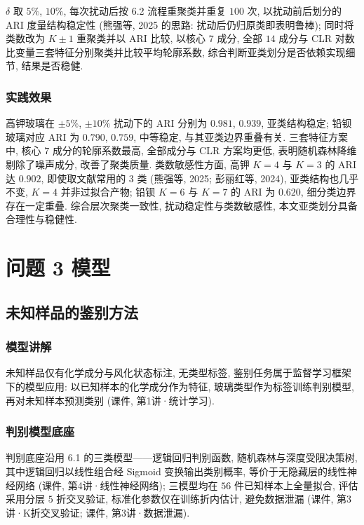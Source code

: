 \documentclass{ctexart}
\begin{document}
$\delta$ 取 $5\%$, $10\%$, 每次扰动后按 6.2 流程重聚类并重复 $100$ 次, 以扰动前后划分的 ARI 度量结构稳定性 (熊强等, 2025 的思路: 扰动后仍归原类即表明鲁棒); 同时将类数改为 $K\pm1$ 重聚类并以 ARI 比较, 以核心 $7$ 成分, 全部 $14$ 成分与 CLR 对数比变量三套特征分别聚类并比较平均轮廓系数, 综合判断亚类划分是否依赖实现细节, 结果是否稳健.


\subsubsection{实践效果}

高钾玻璃在 $\pm5\%$, $\pm10\%$ 扰动下的 ARI 分别为 $0.981$, $0.939$, 亚类结构稳定; 铅钡玻璃对应 ARI 为 $0.790$, $0.759$, 中等稳定, 与其亚类边界重叠有关. 三套特征方案中, 核心 $7$ 成分的轮廓系数最高, 全部成分与 CLR 方案均更低, 表明随机森林降维剔除了噪声成分, 改善了聚类质量. 类数敏感性方面, 高钾 $K=4$ 与 $K=3$ 的 ARI 达 $0.902$, 即使取文献常用的 $3$ 类 (熊强等, 2025; 彭丽红等, 2024), 亚类结构也几乎不变, $K=4$ 并非过拟合产物; 铅钡 $K=6$ 与 $K=7$ 的 ARI 为 $0.620$, 细分类边界存在一定重叠. 综合层次聚类一致性, 扰动稳定性与类数敏感性, 本文亚类划分具备合理性与稳健性.

\section{问题 3 模型}

\subsection{未知样品的鉴别方法}

\subsubsection{模型讲解}

未知样品仅有化学成分与风化状态标注, 无类型标签, 鉴别任务属于监督学习框架下的模型应用: 以已知样本的化学成分作为特征, 玻璃类型作为标签训练判别模型, 再对未知样本预测类别 (课件, 第1讲·统计学习).

\subsubsection{判别模型底座}

判别底座沿用 6.1 的三类模型——逻辑回归判别函数, 随机森林与深度受限决策树, 其中逻辑回归以线性组合经 Sigmoid 变换输出类别概率, 等价于无隐藏层的线性神经网络 (课件, 第4讲·线性神经网络); 三模型均在 $56$ 件已知样本上全量拟合, 评估采用分层 $5$ 折交叉验证, 标准化参数仅在训练折内估计, 避免数据泄漏 (课件, 第3讲·K折交叉验证; 课件, 第3讲·数据泄漏).
\end{document}
